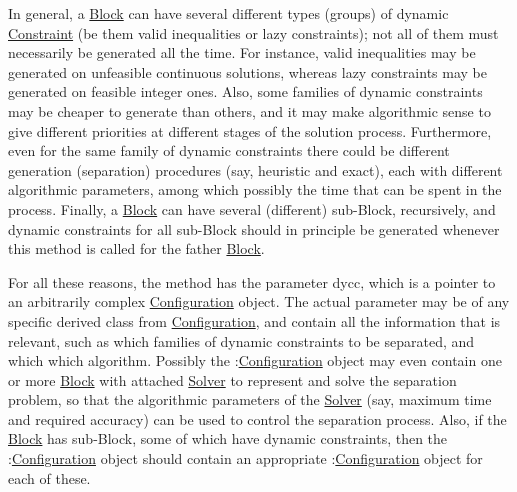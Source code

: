 In general, a \mbox{\hyperlink{class_s_m_spp__di__unipi__it_1_1_block}{Block}} can have several different types (groups) of dynamic \mbox{\hyperlink{class_s_m_spp__di__unipi__it_1_1_constraint}{Constraint}} (be them valid inequalities or lazy constraints); not all of them must necessarily be generated all the time. For instance, valid inequalities may be generated on unfeasible continuous solutions, whereas lazy constraints may be generated on feasible integer ones. Also, some families of dynamic constraints may be cheaper to generate than others, and it may make algorithmic sense to give different priorities at different stages of the solution process. Furthermore, even for the same family of dynamic constraints there could be different generation (separation) procedures (say, heuristic and exact), each with different algorithmic parameters, among which possibly the time that can be spent in the process. Finally, a \mbox{\hyperlink{class_s_m_spp__di__unipi__it_1_1_block}{Block}} can have several (different) sub-\/\+Block, recursively, and dynamic constraints for all sub-\/\+Block should in principle be generated whenever this method is called for the father \mbox{\hyperlink{class_s_m_spp__di__unipi__it_1_1_block}{Block}}.

For all these reasons, the method has the parameter dycc, which is a pointer to an arbitrarily complex \mbox{\hyperlink{class_s_m_spp__di__unipi__it_1_1_configuration}{Configuration}} object. The actual parameter may be of any specific derived class from \mbox{\hyperlink{class_s_m_spp__di__unipi__it_1_1_configuration}{Configuration}}, and contain all the information that is relevant, such as which families of dynamic constraints to be separated, and which which algorithm. Possibly the \+:\mbox{\hyperlink{class_s_m_spp__di__unipi__it_1_1_configuration}{Configuration}} object may even contain one or more \mbox{\hyperlink{class_s_m_spp__di__unipi__it_1_1_block}{Block}} with attached \mbox{\hyperlink{class_s_m_spp__di__unipi__it_1_1_solver}{Solver}} to represent and solve the separation problem, so that the algorithmic parameters of the \mbox{\hyperlink{class_s_m_spp__di__unipi__it_1_1_solver}{Solver}} (say, maximum time and required accuracy) can be used to control the separation process. Also, if the \mbox{\hyperlink{class_s_m_spp__di__unipi__it_1_1_block}{Block}} has sub-\/\+Block, some of which have dynamic constraints, then the \+:\mbox{\hyperlink{class_s_m_spp__di__unipi__it_1_1_configuration}{Configuration}} object should contain an appropriate \+:\mbox{\hyperlink{class_s_m_spp__di__unipi__it_1_1_configuration}{Configuration}} object for each of these.

